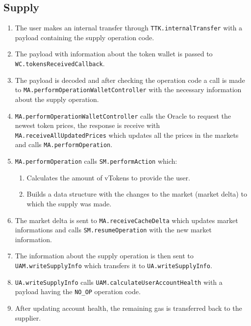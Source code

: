 \subsection{Supply}
\begin{enumerate}
  \item The user makes an internal transfer through \verb|TTK.internalTransfer| with a payload containing the supply operation code.
  \item The payload with information about the token wallet is passed to \\\verb|WC.tokensReceivedCallback|.
  \item The payload is decoded and after checking the operation code a call is made to \verb|MA.performOperationWalletController| with the necessary information about the supply operation.
  \item \verb|MA.performOperationWalletController| calls the Oracle to request the newest token prices, the response is receive with \\\verb|MA.receiveAllUpdatedPrices| which updates all the prices in the markets and calls \verb|MA.performOperation|.
  \item \verb|MA.performOperation| calls \verb|SM.performAction| which: 
  \begin{enumerate}[label*=\arabic*.]
    \item Calculates the amount of vTokens to provide the user.
    \item Builds a data structure with the changes to the market (market delta) to which the supply was made.
  \end{enumerate}
  \item The market delta is sent to \verb|MA.receiveCacheDelta| which updates market informations and calls \verb|SM.resumeOperation| with the new market information.
  \item The information about the supply operation is then sent to \\\verb|UAM.writeSupplyInfo| which transfers it to \verb|UA.writeSupplyInfo|.
  \item \verb|UA.writeSupplyInfo| calls \verb|UAM.calculateUserAccountHealth| with a \\payload having the \verb|NO_OP| operation code.
  \item After updating account health, the remaining gas is transferred back to the supplier.
\end{enumerate}

